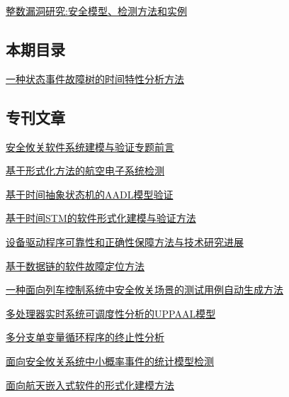 \documentclass[a4paper]{article}
\begin{document}
\href{http://www.jos.org.cn/ch/reader/download_pdf.aspx?file_no=4793&year_id=2015&quarter_id=2&falg=1}{整数漏洞研究:安全模型、检测方法和实例}

\subsection{本期目录}
\href{http://www.jos.org.cn/ch/reader/download_pdf.aspx?file_no=4562&year_id=2015&quarter_id=2&falg=1}{一种状态事件故障树的时间特性分析方法}

\subsection{专刊文章}
\href{http://www.jos.org.cn/ch/reader/download_pdf.aspx?file_no=4789&year_id=2015&quarter_id=2&falg=1}{安全攸关软件系统建模与验证专题前言}

\href{http://www.jos.org.cn/ch/reader/download_pdf.aspx?file_no=4775&year_id=2015&quarter_id=2&falg=1}{基于形式化方法的航空电子系统检测}

\href{http://www.jos.org.cn/ch/reader/download_pdf.aspx?file_no=4776&year_id=2015&quarter_id=2&falg=1}{基于时间抽象状态机的AADL模型验证}

\href{http://www.jos.org.cn/ch/reader/download_pdf.aspx?file_no=4777&year_id=2015&quarter_id=2&falg=1}{基于时间STM的软件形式化建模与验证方法}

\href{http://www.jos.org.cn/ch/reader/download_pdf.aspx?file_no=4778&year_id=2015&quarter_id=2&falg=1}{设备驱动程序可靠性和正确性保障方法与技术研究进展}

\href{http://www.jos.org.cn/ch/reader/download_pdf.aspx?file_no=4779&year_id=2015&quarter_id=2&falg=1}{基于数据链的软件故障定位方法}

\href{http://www.jos.org.cn/ch/reader/download_pdf.aspx?file_no=4780&year_id=2015&quarter_id=2&falg=1}{一种面向列车控制系统中安全攸关场景的测试用例自动生成方法}

\href{http://www.jos.org.cn/ch/reader/download_pdf.aspx?file_no=4781&year_id=2015&quarter_id=2&falg=1}{多处理器实时系统可调度性分析的UPPAAL模型}

\href{http://www.jos.org.cn/ch/reader/download_pdf.aspx?file_no=4782&year_id=2015&quarter_id=2&falg=1}{多分支单变量循环程序的终止性分析}

\href{http://www.jos.org.cn/ch/reader/download_pdf.aspx?file_no=4783&year_id=2015&quarter_id=2&falg=1}{面向安全攸关系统中小概率事件的统计模型检测}

\href{http://www.jos.org.cn/ch/reader/download_pdf.aspx?file_no=4784&year_id=2015&quarter_id=2&falg=1}{面向航天嵌入式软件的形式化建模方法}
\end{document}
